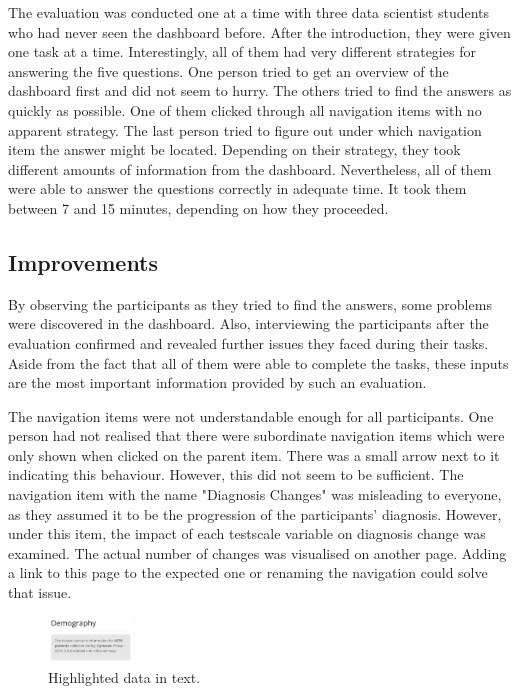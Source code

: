\documentclass[11pt]{article}
\begin{document}
The evaluation was conducted one at a time with three data scientist students who had never seen the dashboard before. After the introduction, they were given one task at a time. Interestingly, all of them had very different strategies for answering the five questions. One person tried to get an overview of the dashboard first and did not seem to hurry. The others tried to find the answers as quickly as possible. One of them clicked through all navigation items with no apparent strategy. The last person tried to figure out under which navigation item the answer might be located. Depending on their strategy, they took different amounts of information from the dashboard. Nevertheless, all of them were able to answer the questions correctly in adequate time. It took them between 7 and 15 minutes, depending on how they proceeded.

\subsection{Improvements}

By observing the participants as they tried to find the answers, some problems were discovered in the dashboard. Also, interviewing the participants after the evaluation confirmed and revealed further issues they faced during their tasks. Aside from the fact that all of them were able to complete the tasks, these inputs are the most important information provided by such an evaluation.

The navigation items were not understandable enough for all participants. One person had not realised that there were subordinate navigation items which were only shown when clicked on the parent item. There was a small arrow next to it indicating this behaviour. However, this did not seem to be sufficient. The navigation item with the name "Diagnosis Changes" was misleading to everyone, as they assumed it to be the progression of the participants' diagnosis. However, under this item, the impact of each testscale variable on diagnosis change was examined. The actual number of changes was visualised on another page. Adding a link to this page to the expected one or renaming the navigation could solve that issue.

\begin{figure}
    \includegraphics[width=0.2\textwidth]{./info-in-text.png}
    \caption{Highlighted data in text.}
    \label{info-in-text}
\end{figure}
\end{document}

